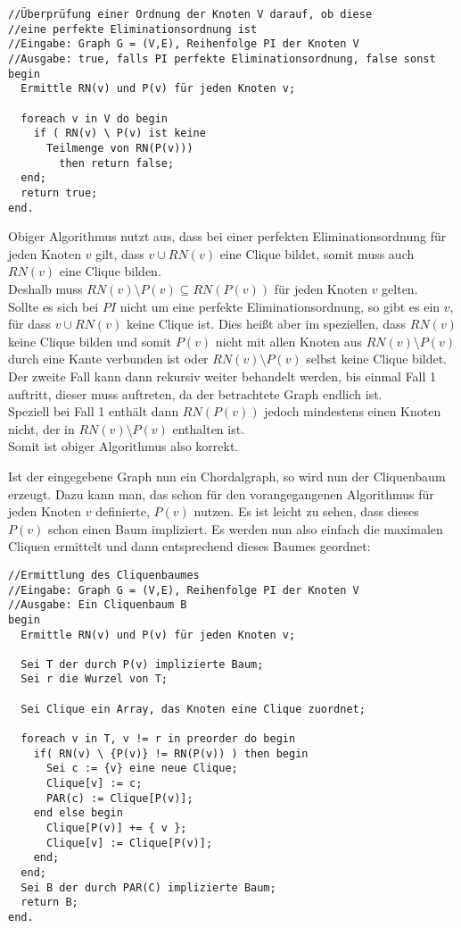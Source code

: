 \begin{lstlisting}
//Überprüfung einer Ordnung der Knoten V darauf, ob diese
//eine perfekte Eliminationsordnung ist
//Eingabe: Graph G = (V,E), Reihenfolge PI der Knoten V
//Ausgabe: true, falls PI perfekte Eliminationsordnung, false sonst
begin
  Ermittle RN(v) und P(v) für jeden Knoten v;
 
  foreach v in V do begin
    if ( RN(v) \ P(v) ist keine
      Teilmenge von RN(P(v)))
        then return false;
  end;
  return true;
end.
\end{lstlisting}

Obiger Algorithmus nutzt aus, dass bei einer perfekten Eliminationsordnung für jeden Knoten $v$ gilt, dass ${v} \cup RN(v)$ eine Clique bildet, somit muss auch $RN(v)$ eine Clique bilden.\\
Deshalb muss $RN(v) \setminus P(v) \subseteq RN(P(v))$ für jeden Knoten $v$ gelten.\\
Sollte es sich bei $PI$ nicht um eine perfekte Eliminationsordnung, so gibt es ein $v$, für dass ${v} \cup RN(v)$ keine Clique ist. Dies heißt aber im speziellen, dass $RN(v)$ keine Clique bilden und somit  $P(v)$ nicht mit allen Knoten aus $RN(v) \setminus P(v)$ durch eine Kante verbunden ist oder $RN(v) \setminus P(v)$ selbst keine Clique bildet. Der zweite Fall kann dann rekursiv weiter behandelt werden, bis einmal Fall 1 auftritt, dieser muss auftreten, da der betrachtete Graph endlich ist.\\
Speziell bei Fall 1 enthält dann $RN(P(v))$ jedoch mindestens einen Knoten nicht, der in $RN(v) \setminus P(v)$ enthalten ist.\\
Somit ist obiger Algorithmus also korrekt.

Ist der eingegebene Graph nun ein Chordalgraph, so wird nun der Cliquenbaum erzeugt. Dazu kann man, das schon für den vorangegangenen Algorithmus für jeden Knoten $v$ definierte, $P(v)$ nutzen. Es ist leicht zu sehen, dass dieses $P(v)$ schon einen Baum impliziert. Es werden nun also einfach die maximalen Cliquen ermittelt und dann entsprechend dieses Baumes geordnet:

\begin{lstlisting}
//Ermittlung des Cliquenbaumes
//Eingabe: Graph G = (V,E), Reihenfolge PI der Knoten V
//Ausgabe: Ein Cliquenbaum B
begin
  Ermittle RN(v) und P(v) für jeden Knoten v;
 
  Sei T der durch P(v) implizierte Baum;
  Sei r die Wurzel von T;
  
  Sei Clique ein Array, das Knoten eine Clique zuordnet;
  
  foreach v in T, v != r in preorder do begin
    if( RN(v) \ {P(v)} != RN(P(v)) ) then begin
      Sei c := {v} eine neue Clique;
      Clique[v] := c;
      PAR(c) := Clique[P(v)];
    end else begin
      Clique[P(v)] += { v };
      Clique[v] := Clique[P(v)];
    end;    
  end;
  Sei B der durch PAR(C) implizierte Baum;
  return B;   
end.
\end{lstlisting}

